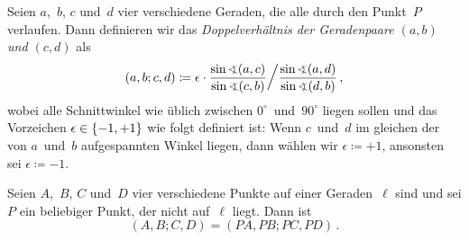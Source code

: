 \begin{definition}
	Seien $a$,~$b$, $c$ und~$d$ vier verschiedene Geraden, die alle durch den Punkt~$P$ verlaufen. Dann definieren wir das \emph{Doppelverhältnis der Geradenpaare $(a,b)$ und $(c,d)$} als
	\begin{equation*}
		(a,b;c,d)\coloneqq \epsilon\cdot \frac{\sin\winkel(a,c)}{\sin\winkel(c,b)}\bigg/\frac{\sin\winkel (a,d)}{\sin\winkel (d,b)}\,,
	\end{equation*}
	wobei alle Schnittwinkel wie üblich zwischen $0^\circ$~und~$90^\circ$ liegen sollen und das Vorzeichen $\epsilon\in \lbrace-1,+1\rbrace$ wie folgt definiert ist: Wenn $c$~und~$d$ im gleichen der von $a$~und~$b$ aufgespannten Winkel liegen, dann wählen wir $\epsilon\coloneqq+1$, ansonsten sei $\epsilon\coloneqq-1$.
\end{definition}

\begin{satzmitnamen}[Lemma]
	Seien $A$,~$B$, $C$ und~$D$ vier verschiedene Punkte auf einer Geraden~$\ell$ sind und sei $P$ ein beliebiger Punkt, der nicht auf~$\ell$ liegt. Dann ist %
	\begin{equation*}
		\left(A,B;C,D\right)=\left(PA,PB;PC,PD\right)\,.
	\end{equation*}
\end{satzmitnamen}

